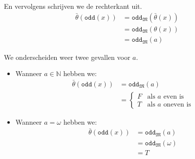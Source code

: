 \documentclass[a4paper,11pt]{article}
\begin{document}
\begin{itemize}
En vervolgens schrijven we de rechterkant uit.
\begin{align*}
\bar \theta(\texttt{odd}(x)) &= \texttt{odd}_{\mathfrak{M}}(\bar \theta(x)) \\
                             &= \texttt{odd}_{\mathfrak{M}}(\theta(x)) \\
                             &= \texttt{odd}_{\mathfrak{M}}(a)
\end{align*}

We onderscheiden weer twee gevallen voor $a$.

\begin{itemize}

\item
Wanneer $a \in \mathbb{N}$ hebben we:
\begin{align*}
\bar \theta(\texttt{odd}(x)) &= \texttt{odd}_{\mathfrak{M}}(a) \\
                             &= \begin{cases}
  F & \text{als $a$ even is} \\
  T & \text{als $a$ oneven is}
\end{cases}
\end{align*}

\item
Wanneer $a = \omega$ hebben we:
\begin{align*}
\bar \theta(\texttt{odd}(x)) &= \texttt{odd}_{\mathfrak{M}}(a) \\
                             &= \texttt{odd}_{\mathfrak{M}}(\omega) \\
                             &= T
\end{align*}

\end{itemize}

\end{itemize}

\paragraph{}
\end{document}
